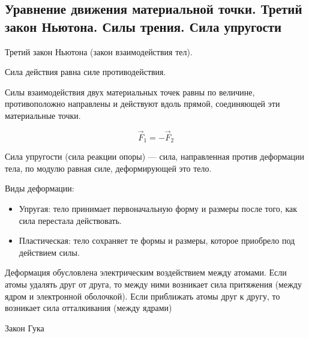 \subsection{Уравнение движения материальной точки. Третий закон Ньютона. Силы трения. Сила упругости}

\begin{definition}
    Третий закон Ньютона (закон взаимодействия тел).

    Сила действия равна силе противодействия.

    Силы взаимодействия двух материальных точек равны по величине, противоположно направлены и действуют вдоль прямой, соединяющей эти материальные точки.
\end{definition}

$$\vec F_1=-\vec F_2$$

\begin{definition}
    Сила упругости (сила реакции опоры) — сила, направленная против деформации тела, по модулю равная силе, деформирующей это тело.
\end{definition}

Виды деформации:
\begin{itemize}
    \item Упругая: тело принимает первоначальную форму и размеры после того, как сила перестала действовать.
    \item Пластическая: тело сохраняет те формы и размеры, которое приобрело под действием силы.
\end{itemize}

Деформация обусловлена электрическим воздействием между атомами. Если атомы удалять друг от друга, то между ними возникает сила притяжения 
(между ядром и электронной оболочкой). Если приближать атомы друг к другу, то возникает сила отталкивания (между ядрами)

\begin{definition} Закон Гука \end{definition}

